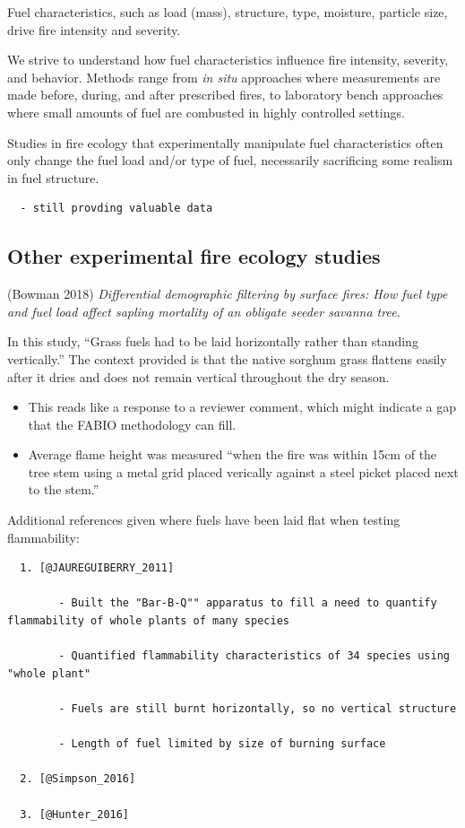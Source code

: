 \documentclass[11pt,a4paper]{article}
\begin{document}
Fuel characteristics, such as load (mass), structure, type, moisture,
particle size, drive fire intensity and severity.

We strive to understand how fuel characteristics influence fire
intensity, severity, and behavior. Methods range from \emph{in situ}
approaches where measurements are made before, during, and after
prescribed fires, to laboratory bench approaches where small amounts of
fuel are combusted in highly controlled settings.

Studies in fire ecology that experimentally manipulate fuel
characteristics often only change the fuel load and/or type of fuel,
necessarily sacrificing some realism in fuel structure.

\begin{verbatim}
  - still provding valuable data
\end{verbatim}

\subsection{Other experimental fire ecology
studies}\label{other-experimental-fire-ecology-studies}

(Bowman 2018) \emph{Differential demographic filtering by surface fires:
How fuel type and fuel load affect sapling mortality of an obligate
seeder savanna tree.}

In this study, ``Grass fuels had to be laid horizontally rather than
standing vertically.'' The context provided is that the native sorghum
grass flattens easily after it dries and does not remain vertical
throughout the dry season.

\begin{itemize}
\item
  This reads like a response to a reviewer comment, which might indicate
  a gap that the FABIO methodology can fill.
\item
  Average flame height was measured ``when the fire was within 15cm of
  the tree stem using a metal grid placed verically against a steel
  picket placed next to the stem.''
\end{itemize}

Additional references given where fuels have been laid flat when testing
flammability:

\begin{verbatim}
  1. [@JAUREGUIBERRY_2011]

        - Built the "Bar-B-Q"" apparatus to fill a need to quantify flammability of whole plants of many species

        - Quantified flammability characteristics of 34 species using "whole plant"

        - Fuels are still burnt horizontally, so no vertical structure

        - Length of fuel limited by size of burning surface

  2. [@Simpson_2016]

  3. [@Hunter_2016]
\end{verbatim}
\end{document}
